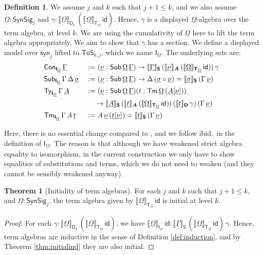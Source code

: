 \documentclass{article}
\theoremstyle{definition}
\newtheorem{definition}{Definition}
\theoremstyle{theorem}
\newtheorem{theorem}{Theorem}
\newcommand{\id}{\mathsf{id}}
\newcommand{\Con}{\mathsf{Con}}
\newcommand{\Sub}{\mathsf{Sub}}
\newcommand{\Tm}{\mathsf{Tm}}
\newcommand{\Ty}{\mathsf{Ty}}
\newcommand{\ra}{\rightarrow}
\newcommand{\ToS}{\mathsf{ToS}}
\newcommand{\syn}{\mathsf{syn}}
\newcommand{\SynSig}{\mathsf{SynSig}}
\newcommand{\bA}{\boldsymbol{A}}
\newcommand{\bT}{\boldsymbol{\mathsf{T}}}
\newcommand{\bS}{\boldsymbol{\mathsf{S}}}
\newcommand{\bD}{\boldsymbol{\mathsf{D}}}
\newcommand{\bI}{\boldsymbol{\mathsf{I}}}
\newcommand{\ul}[1]{\underline{#1}}
\newcommand{\ulGamma}{\ul{\Gamma}}
\newcommand{\ulOmega}{\ul{\Omega}}
\newcommand{\ulsigma}{\ul{\sigma}}
\newcommand{\ulnu}{\ul{\nu}}
\newcommand{\ult}{\ul{t}}
\newcommand{\ulA}{\ul{A}}
\newcommand{\llb}{\llbracket}
\newcommand{\rrb}{\rrbracket}
\begin{document}
\begin{definition}
We assume $j$ and $k$ such that $j + 1 \leq k$, and we also assume $\ulOmega :
\SynSig_j$ and $\gamma :
\llb\ulOmega\rrb_{\bD_k}\,(\llb\ulOmega\rrb_{\bT_{\ulOmega}}\,\id)$.  Hence,
$\gamma$ is a displayed $\ulOmega$-algebra over the term algebra, at level
$k$. We are using the cumulativity of $\ulOmega$ here to lift the term algebra
appropriately.  We aim to show that $\gamma$ has a section. We define a
displayed model over $\syn_j$ lifted to $\ToS_{k, j}$, which we name
$\bI_{\ulOmega}$. The underlying sets are:
\begin{alignat*}{3}
  & \Con_{\bI_{\ulOmega}}\,\ulGamma &&:= (\ulnu : \Sub\,\ulOmega\,\ulGamma)\ra
  \llb\ulGamma\rrb_{\bS}\,(\llb\ulnu\rrb_{\bA}\,(\llb\ulOmega\rrb_{\bT_{\ulOmega}}\,\id))\,\gamma\\
  & \Sub_{\bI_{\ulOmega}}\,\Gamma\,\Delta\,\ulsigma && := (\ulnu : \Sub\,\ulOmega\,\ulGamma)\ra
    \Delta\,(\ulsigma\circ\ulnu) = \llb\ulsigma\rrb_{\bS}\,(\Gamma\,\ulnu)\\
  & \Ty_{\bI_{\ulOmega}}\,\Gamma\,\ulA &&:=
  (\ulnu : \Sub\,\ulOmega\,\ulGamma)(t : \Tm\,\ulOmega\,(\ulA[\ulnu]))\\
  & && \hspace{1.2em}\ra
  \llb\ulA\rrb_{\bS}\,(\llb\ult\rrb_{\bA}\,(\llb\ulOmega\rrb_{\bT_{\ulOmega}}\,\id))\,
  (\llb\ult\rrb_{\bD}\,\gamma)\,(\Gamma\,\ulnu)\\
  & \Tm_{\bI_{\ulOmega}}\,\Gamma\,A\,\ult &&:= A\,\ulnu\,(\ult[\ulnu]) = \llb\ult\rrb_{\bS}\,(\Gamma\,\ulnu)
\end{alignat*}

Here, there is no essential change compared to \cite{kaposi2019constructing},
and we follow ibid.\ in the definition of $\bI_{\ulOmega}$. The reason is that
although we have weakened strict algebra equality to isomorphism, in the current
construction we only have to show equalities of substitutions and terms, which
we do not need to weaken (and they cannot be sensibly weakened anyway).
\end{definition}

\begin{theorem}[Initiality of term algebras]
For each $j$ and $k$ such that $j + 1 \leq k$, and $\ulOmega : \SynSig_j$, the
term algebra given by $\llb\ulOmega\rrb_{\bT_{\ulOmega}}\,\id$ is initial at
level $k$.
\end{theorem}
\begin{proof}
For each $\gamma :
\llb\ulOmega\rrb_{\bD_k}\,(\llb\ulOmega\rrb_{\bT_{\ulOmega}}\,\id)$, we have
$\llb\ulOmega\rrb_{\bI_{\ulOmega}}\,\id :
\llb\ulGamma\rrb_{\bS}\,(\llb\ulOmega\rrb_{\bT_{\ulOmega}}\,\id)\,\gamma$. Hence,
term algebras are inductive in the sense of Definition \ref{def:induction}, and
by Theorem \ref{thm:initialind} they are also initial.
\end{proof}
\end{document}
